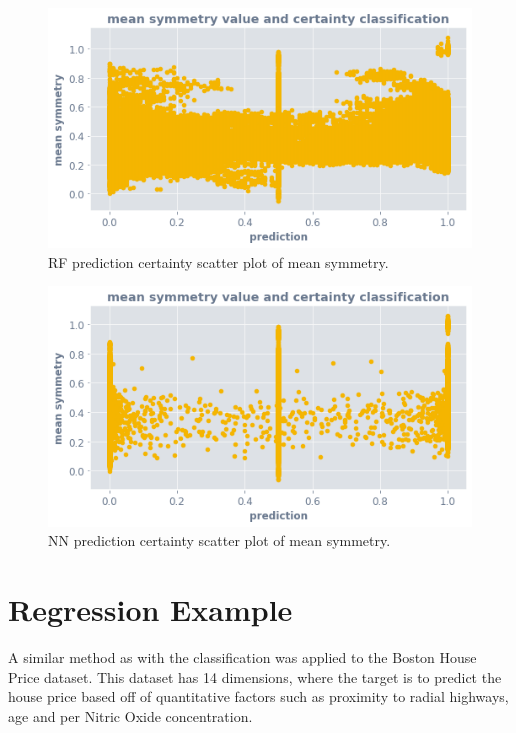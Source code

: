 \documentclass[a4paperpaper,twocolumn]{article}
\begin{document}
\begin{figure}
\centering
\includegraphics[width=\columnwidth]{img/rf_ocsvm_mean_symmetry.png}
\caption{RF prediction certainty scatter plot of mean symmetry.}
\label{fig:nn-ocsvm-mean-symmetry-scatter}
\end{figure}

\begin{figure}
\centering
\includegraphics[width=\columnwidth]{img/nn_ocsvm_mean_symmetry.png}
\caption{NN prediction certainty scatter plot of mean symmetry.}
\label{fig:nn-ocsvm-mean-symmetry-scatter}
\end{figure}

\section{Regression Example}

A similar method as with the classification was applied to the Boston House Price dataset. This dataset has 14 dimensions, where the target is to predict the house price based off of quantitative factors such as proximity to radial highways, age and per Nitric Oxide concentration.
\end{document}
